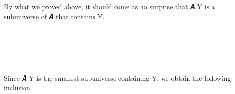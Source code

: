 \ccpad
By what we proved above, it should come as no surprise that  \ab 𝑨 \ab Y is a subuniverse of \ab 𝑨 that contains \ab Y.
\ccpad
\begin{code}%
\>[0][@{}l@{\AgdaIndent{1}}]%
\>[1]\AgdaSpace{}%
\AgdaSymbol{:}\AgdaSpace{}%
\AgdaSymbol{\{}\AgdaSpace{}%
\AgdaSymbol{:}\AgdaSpace{}%
\AgdaSpace{}%
\AgdaSpace{}%
\AgdaSymbol{\}\{}\AgdaSpace{}%
\AgdaSymbol{:}\AgdaSpace{}%
\AgdaSpace{}%
\AgdaSpace{}%
\AgdaSpace{}%
\AgdaSpace{}%
\AgdaSymbol{\}}\AgdaSpace{}%
\AgdaSpace{}%
\AgdaSpace{}%
\AgdaSpace{}%
\AgdaSpace{}%
\AgdaSpace{}%
\AgdaSpace{}%
\<%
\\
%
\>[1]\AgdaSpace{}%
\AgdaSymbol{=}\AgdaSpace{}%
\<%
\\
%
\\[\AgdaEmptyExtraSkip]%
%
\>[1]\AgdaSpace{}%
\AgdaSymbol{:}\AgdaSpace{}%
\AgdaSymbol{\{}\AgdaSpace{}%
\AgdaSymbol{:}\AgdaSpace{}%
\AgdaSpace{}%
\AgdaSpace{}%
\AgdaSymbol{\}\{}\AgdaSpace{}%
\AgdaSymbol{:}\AgdaSpace{}%
\AgdaSpace{}%
\AgdaSpace{}%
\AgdaSpace{}%
\AgdaSpace{}%
\AgdaSymbol{\}}\AgdaSpace{}%
\AgdaSpace{}%
\AgdaSpace{}%
\AgdaSpace{}%
\AgdaSpace{}%
\AgdaSpace{}%
\<%
\\
%
\>[1]\AgdaSpace{}%
\AgdaSymbol{\{}\AgdaSymbol{\}}\AgdaSpace{}%
\AgdaSpace{}%
\AgdaSymbol{=}\AgdaSpace{}%
\AgdaSpace{}%
\<%
\end{code}
\ccpad
Since  \ab 𝑨 \ab Y is the smallest subuniverse containing \ab Y, we obtain the following inclusion.
\ccpad

